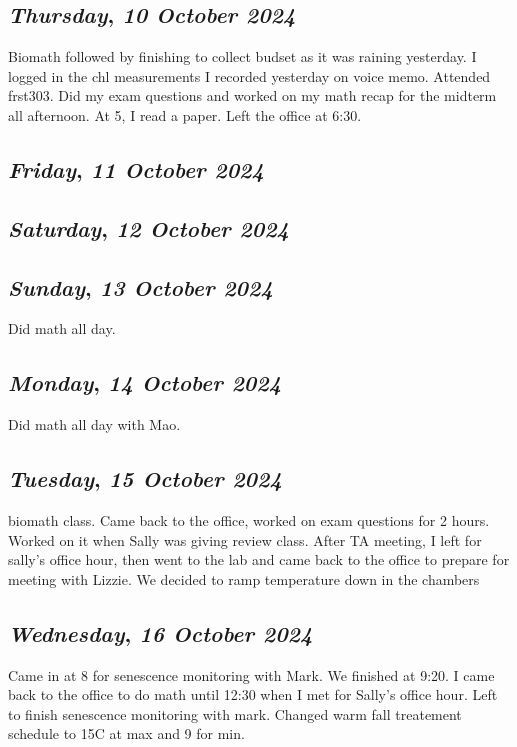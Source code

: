 \def\day{\textit{10 October 2024}}
\def\weekday{\textit{Thursday}}
\subsection*{\weekday, \day}
Biomath followed by finishing to collect budset as it was raining yesterday. I logged in the chl measurements I recorded yesterday on voice memo. Attended frst303. Did my exam questions and worked on my math recap for the midterm all afternoon. At 5, I read a paper. Left the office at 6:30. 
\def\day{\textit{11 October 2024}}
\def\weekday{\textit{Friday}}
\subsection*{\weekday, \day}

\def\day{\textit{12 October 2024}}
\def\weekday{\textit{Saturday}}
\subsection*{\weekday, \day}

\def\day{\textit{13 October 2024}}
\def\weekday{\textit{Sunday}}
\subsection*{\weekday, \day}
Did math all day.

\def\day{\textit{14 October 2024}}
\def\weekday{\textit{Monday}}
\subsection*{\weekday, \day}
Did math all day with Mao. 

\def\day{\textit{15 October 2024}}
\def\weekday{\textit{Tuesday}}
\subsection*{\weekday, \day}
biomath class. Came back to the office, worked on exam questions for 2 hours. Worked on it when Sally was giving review class. After TA meeting, I left for sally's office hour, then went to the lab and came back to the office to prepare for meeting with Lizzie. We decided to ramp temperature down in the chambers

\def\day{\textit{16 October 2024}}
\def\weekday{\textit{Wednesday}}
\subsection*{\weekday, \day}
Came in at 8 for senescence monitoring with Mark. We finished at 9:20. I came back to the office to do math until 12:30 when I met for Sally's office hour. Left to finish senescence monitoring with mark. Changed warm fall treatement schedule to 15C at max and 9 for min.

